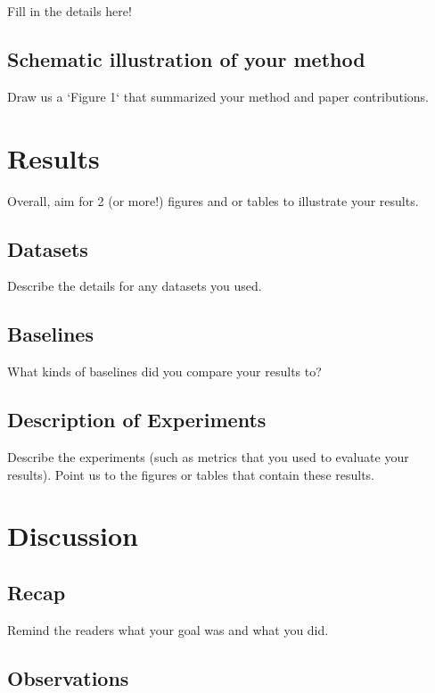 \documentclass{article}
\begin{document}
Fill in the details here! 

\subsection{Schematic illustration of your method}

Draw us a `Figure 1` that summarized your method and paper contributions. 

\section{Results}

Overall, aim for 2 (or more!) figures and or tables to illustrate your results. 

\subsection{Datasets}

Describe the details for any datasets you used. 

\subsection{Baselines}

What kinds of baselines did you compare your results to?

\subsection{Description of Experiments}

Describe the experiments (such as metrics that you used to evaluate your results). Point us to the figures or tables that contain these results. 

\section{Discussion}

\subsection{Recap}

Remind the readers what your goal was and what you did. 

\subsection{Observations}
\end{document}
